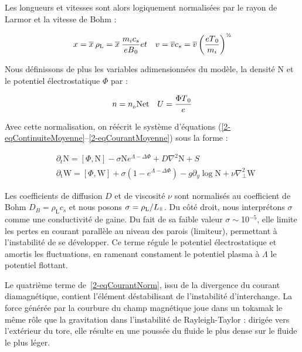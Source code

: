 \begin{refsection}
Les longueurs et vitesses sont alors logiquement normalisées par le rayon de
Larmor et la vitesse de Bohm :

\begin{eqnarray}
x = \overline{x}\:\rho_\text{L} =
\overline{x}\:\frac{m_ic_s}{eB\indice{0}} &
et &
v=\overline{v}c_s=\overline{v}\left(\frac{eT\indice{0}}{m_i}\right)^{\text{\textonehalf}}
\end{eqnarray}

Nous définissons de plus les variables adimensionnées du modèle, la densité
$\text{N}$ et le potentiel électrostatique $\Phi$ par :

\begin{eqnarray}
n = n_{{_{0}}}\text{N} & \text{et} & U=\frac{\Phi T{_{0}}}{e}
\end{eqnarray}

Avec cette normalisation, on
réécrit le système d'équations
(\eqref{2-eqContinuiteMoyenne}--\eqref{2-eqCourantMoyenne}) sous la forme :

\begin{align}
\label{2-eqContinuiteNorm}
&\partial_t \text{N}
= \left[\Phi,\text{N}\right] -\sigma \text{N}e^{\Lambda-\Delta\Phi}
 + D\nabla^2 \text{N} + S
\\
\label{2-eqCourantNorm}
&\partial_\text{t}\text{W} = 
\left[\Phi,\text{W}\right]
+\sigma\left(1-e^{\Lambda-\Delta\Phi}\right) 
-g\partial_y\log\text{N}
+\nu\nabla_\perp^2\text{W}
\end{align}
 
Les coefficients de diffusion $D$ et de viscosité $\nu$ sont normalisés au
coefficient de Bohm $D_B=\rho_\text{L}c_s$ et nous posons
$\sigma=\rho_\text{L}/L_\para$. Du côté droit, nous interprétons $\sigma$
comme une conductivité de gaine. Du fait de sa faible valeur
$\sigma\sim$10$^{-5}$, elle limite les pertes en courant parallèle au niveau des
parois (limiteur), permettant à l'instabilité de se développer. Ce terme régule
le potentiel électrostatique et amortis les fluctuations, en ramenant constament
le potentiel plasma à $\Lambda$ le potentiel flottant.

Le quatrième terme de~\eqref{2-eqCourantNorm}, issu de la divergence
du courant diamagnétique, contient l'élément déstabilisant de
 l'instabilité d'interchange. La force générée par la courbure du champ
 magnétique joue dans un tokamak le même rôle que la gravitation dans
 l'instabilité de Rayleigh-Taylor : dirigée vers l'extérieur du tore, elle 
 résulte en une poussée du fluide le plus dense sur le fluide le plus léger. 
 

\end{refsection}
